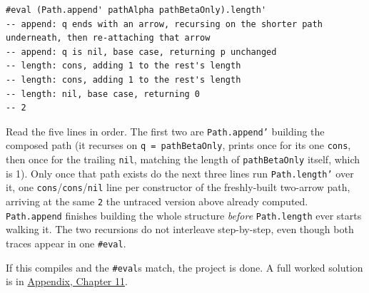 \begin{pblproject}
\begin{lstlisting}
#eval (Path.append' pathAlpha pathBetaOnly).length'
-- append: q ends with an arrow, recursing on the shorter path underneath, then re-attaching that arrow
-- append: q is nil, base case, returning p unchanged
-- length: cons, adding 1 to the rest's length
-- length: cons, adding 1 to the rest's length
-- length: nil, base case, returning 0
-- 2
\end{lstlisting}

Read the five lines in order. The first two are \texttt{Path.append'} building the composed path (it recurses on \texttt{q = pathBetaOnly}, prints once for its one \texttt{cons}, then once for the trailing \texttt{nil}, matching the length of \texttt{pathBetaOnly} itself, which is 1). Only once that path exists do the next three lines run \texttt{Path.length'} over it, one \texttt{cons}/\texttt{cons}/\texttt{nil} line per constructor of the freshly-built two-arrow path, arriving at the same \texttt{2} the untraced version above already computed. \texttt{Path.append} finishes building the whole structure \emph{before} \texttt{Path.length} ever starts walking it. The two recursions do not interleave step-by-step, even though both traces appear in one \texttt{\#eval}.

If this compiles and the \texttt{\#eval}s match, the project is done. A full worked solution is in \hyperref[sec:14-appendix-solutions:10-chapter-11:1]{Appendix, Chapter 11}.

\end{pblproject}
